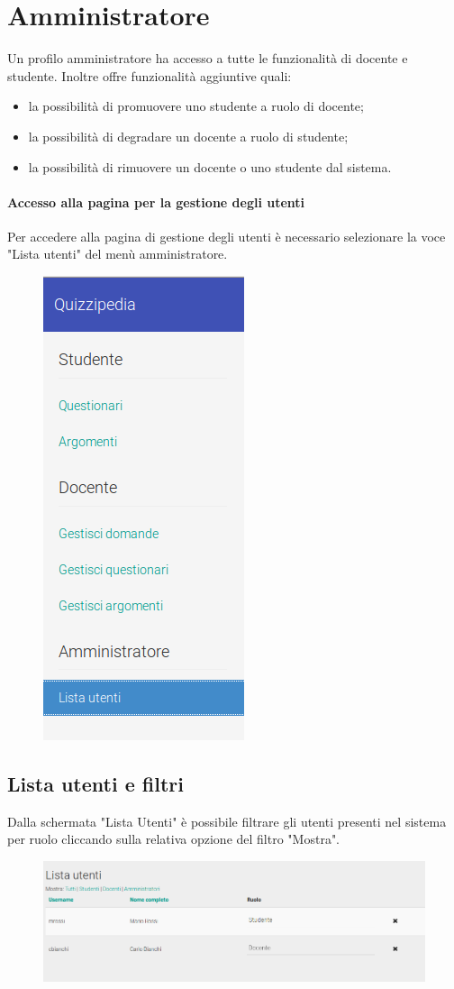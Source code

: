 \documentclass[12pt,a4paper]{article}
\begin{document}
	
		\section{Amministratore}
		Un profilo amministratore ha accesso a tutte le funzionalità di docente e studente.
		Inoltre offre funzionalità aggiuntive quali:
		\begin{itemize}
			\item la possibilità di promuovere uno studente a ruolo di docente;
			\item la possibilità di degradare un docente a ruolo di studente;
			\item la possibilità di rimuovere un docente o uno studente dal sistema.
		\end{itemize}
		\paragraph{Accesso alla pagina per la gestione degli utenti}
		Per accedere alla pagina di gestione degli utenti è necessario selezionare la voce "Lista utenti" del menù amministratore.
		\begin{figure}[h]
			\centering
			\includegraphics[width=0.2\linewidth]{../img/screenshot/usersList_menu.png}
			\caption{}
			\label{Lista utenti}
		\end{figure}
		\subsection{Lista utenti e filtri}
        Dalla schermata "Lista Utenti" è possibile filtrare gli utenti presenti nel sistema per ruolo cliccando sulla relativa opzione del filtro "Mostra".
		\begin{figure}[h]
			
			\centering
			\includegraphics[width=1.0\linewidth]{../img/screenshot/usersList_crop.png}
			\caption{}
			\label{Lista utenti}
		\end{figure}
		
\end{document}
